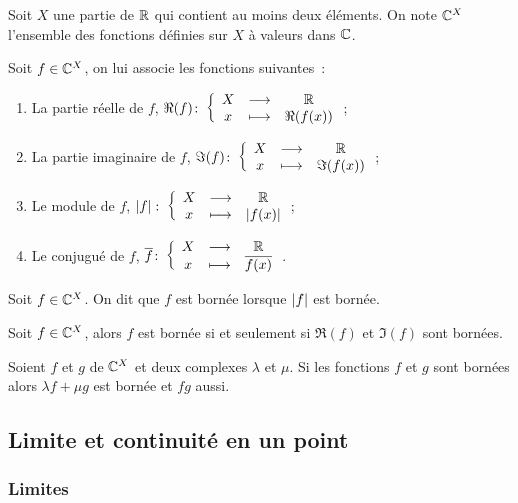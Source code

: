 Soit \(X\) une partie de \(\mathbb{R}\) qui contient au moins deux éléments. On note 
\(\mathbb{C}^X\) l'ensemble des fonctions définies sur \(X\) à valeurs dans \(\mathbb{C}\).

\begin{defdef}
  Soit \(f \in \mathbb{C}^X\), on lui associe les fonctions suivantes~:
  \begin{enumerate}
    \item La partie réelle de \(f\), \(\Re(f)\colon\left\{\begin{array}{ccc}X & \longrightarrow &\mathbb{R}\\x & \longmapsto & \Re(f(x))\end{array}\right.\);
    \item La partie imaginaire de \(f\), 
      \(\Im(f)\colon\left\{\begin{array}{ccc}X & \longrightarrow &\mathbb{R}\\x & \longmapsto & \Im(f(x))\end{array}\right.\);
    \item Le module de \(f\), \(\left\lvert f\right\rvert\colon\left\{\begin{array}{ccc}X & \longrightarrow &\mathbb{R}\\x & \longmapsto & \left\lvert f(x)\right\rvert\end{array}\right.\);
    \item Le conjugué de \(f\), \(\overline{f}\colon\left\{\begin{array}{ccc}X & \longrightarrow &\mathbb{R}\\x & \longmapsto & \overline{f(x)}\end{array}\right.\).
  \end{enumerate}
\end{defdef}
\begin{defdef}
  Soit \(f \in \mathbb{C}^X\). On dit que \(f\) est bornée lorsque \(\left\lvert f\right\rvert\) est 
  bornée.
\end{defdef}
\begin{prop}
  Soit \(f \in \mathbb{C}^X\), alors \(f\) est bornée si et seulement si \(\Re(f)\) et 
  \(\Im(f)\) sont bornées.
\end{prop}
\begin{prop}
  Soient \(f\) et \(g\) de \(\mathbb{C}^X\) et deux complexes \(\lambda\) et \(\mu\). Si 
  les fonctions \(f\) et \(g\) sont bornées alors \(\lambda f+\mu g\) est bornée 
  et \(fg\) aussi.
\end{prop}

\subsection{Limite et continuité en un point}

\subsubsection{Limites}

